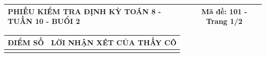 \documentclass[12pt,a4paper]{article}
\begin{document}
\pagestyle{empty}
\noindent
\begin{tabularx}{\linewidth}{|X|c|}
\hline
\textbf{PHIẾU KIỂM TRA ĐỊNH KỲ TOÁN 8 - TUẦN 10 - BUỔI 2} & \textbf{Mã đề: 101 - Trang 1/2} \\
\hline
\end{tabularx}

\vspace{1.2mm}

\noindent
\begin{tabularx}{\linewidth}{|p{3.2cm}|X|}
\hline
\centering\textbf{ĐIỂM SỐ} & \centering\textbf{LỜI NHẬN XÉT CỦA THẦY CÔ} \tabularnewline
\hline
\rule{0pt}{1.8cm} & \tabularnewline
\hline
\end{tabularx}
\end{document}
